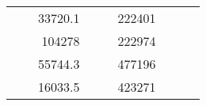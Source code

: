 \begin{table}[H]
\begin{tabular}{|ccrccrccc}
\multicolumn{1}{|c|}{\cellcolor[HTML]{FFFFC7}}                                & \multicolumn{1}{c|}{\cellcolor[HTML]{DAE8FC}}                      & \multicolumn{1}{r|}{\cellcolor[HTML]{DAE8FC}33720.1}   & \multicolumn{1}{c|}{\cellcolor[HTML]{FFFFC7}}                                & \multicolumn{1}{c|}{\cellcolor[HTML]{DAE8FC}}                       & \multicolumn{1}{r|}{\cellcolor[HTML]{DDFDFF}222401}    &                                                                              &                                                                    &                                                        \\ \cline{3-3} \cline{6-6}
\multicolumn{1}{|c|}{\cellcolor[HTML]{FFFFC7}}                                & \multicolumn{1}{c|}{\cellcolor[HTML]{DAE8FC}}                      & \multicolumn{1}{r|}{\cellcolor[HTML]{DDFDFF}104278}    & \multicolumn{1}{c|}{\cellcolor[HTML]{FFFFC7}}                                & \multicolumn{1}{c|}{\cellcolor[HTML]{DAE8FC}}                       & \multicolumn{1}{r|}{\cellcolor[HTML]{DAE8FC}222974}    &                                                                              &                                                                    &                                                        \\ \cline{3-3} \cline{6-6}
\multicolumn{1}{|c|}{\cellcolor[HTML]{FFFFC7}}                                & \multicolumn{1}{c|}{\cellcolor[HTML]{DAE8FC}}                      & \multicolumn{1}{r|}{\cellcolor[HTML]{DAE8FC}55744.3}   & \multicolumn{1}{c|}{\cellcolor[HTML]{FFFFC7}}                                & \multicolumn{1}{c|}{\cellcolor[HTML]{DAE8FC}}                       & \multicolumn{1}{r|}{\cellcolor[HTML]{DDFDFF}477196}    &                                                                              &                                                                    &                                                        \\ \cline{3-3} \cline{6-6}
\multicolumn{1}{|c|}{\cellcolor[HTML]{FFFFC7}}                                & \multicolumn{1}{c|}{\cellcolor[HTML]{DAE8FC}}                      & \multicolumn{1}{r|}{\cellcolor[HTML]{DDFDFF}16033.5}   & \multicolumn{1}{c|}{\cellcolor[HTML]{FFFFC7}}                                & \multicolumn{1}{c|}{\cellcolor[HTML]{DAE8FC}}                       & \multicolumn{1}{r|}{\cellcolor[HTML]{DAE8FC}423271}    &                                                                              &                                                                    &                                                        \\ \cline{3-3} \cline{6-6}

\end{tabular}
\end{table}
